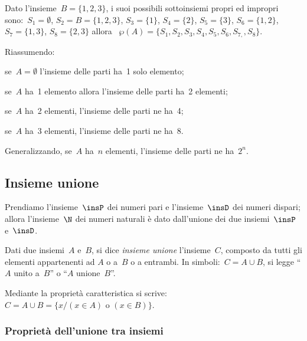 \begin{esempio}
 Dato l'insieme~\(B=\{1,2,3\}\), i suoi possibili
sottoinsiemi propri ed impropri sono:~\(S_{1}=\emptyset\),
\(S_{2}=B=\{1,2,3\}\), \(S_{3}=\{1\}\), \(S_{4}=\{2\}\), \(S_{5}=\{3\}\),
\(S_{6}=\{1,2\}\), \(S_{7}=\{1,3\}\), \(S_{8}=\{2,3\}\)
allora~
\(\wp (A)=\{S_{1}, S_{2}, S_{3}, S_{4}, S_{5}, S_{6}, S_{7,}, S_{8}\}\).
 \end{esempio}

 Riassumendo:
\begin{itemize*}
\item se~\(A=\emptyset \) l'insieme delle parti ha~1 solo elemento;
\item se~\(A\) ha~1 elemento allora l'insieme delle parti ha~2 elementi;
\item se~\(A\) ha~2 elementi, l'insieme delle parti ne ha~4;
\item se~\(A\) ha~3 elementi, l'insieme delle parti ne ha~8.
\end{itemize*}

Generalizzando, se~\(A\) ha~\(n\) elementi, l'insieme delle parti ne 
ha~\(2^{n}\).


\subsection{Insieme unione}
\label{subsec:op_unione}

Prendiamo l'insieme~\(\insP\) dei numeri pari e l'insieme~\(\insD\) dei 
numeri dispari; allora l'insieme~\(\N\) dei numeri naturali è dato 
dall'unione dei due insiemi~\(\insP\) e~\(\insD\).

\begin{definizione}
Dati due insiemi~\(A\) e~\(B\), si dice
\emph{insieme unione} l'insieme~\(C\), composto da tutti gli elementi 
appartenenti ad \(A\) o a~\(B\) o a entrambi.
In simboli:~\(C=A\cup B\), si legge ``\(A\) unito a~\(B\)''
o ``\(A\) unione~\(B\)''.
\end{definizione}
\begin{center}
 
\end{center}


Mediante la proprietà caratteristica si 
scrive:~\(C=A\cup B=\{x/(x\in A)\text{ o }(x\in B)\}\).

\subsubsection{Proprietà dell'unione tra insiemi}

